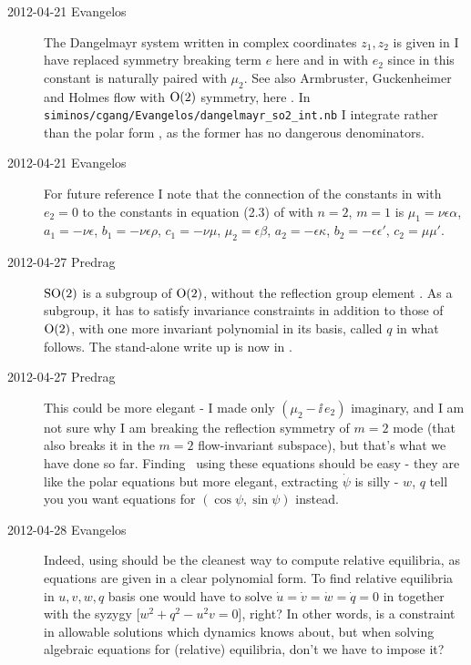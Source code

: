 \begin{description}
\item[2012-04-21 Evangelos]
The Dangelmayr system written in complex coordinates $z_1,z_2$
is given in  I have replaced symmetry breaking term $e$
here and in  with $e_2$ since in this constant is
naturally paired with $\mu_2$. See also Armbruster, Guckenheimer and
Holmes flow with $\textrm{O}(2)$ symmetry, here . In
\texttt{siminos/cgang/Evangelos/dangelmayr\_so2\_int.nb} I integrate
 rather than the polar form , as the
former has no dangerous denominators.

\item[2012-04-21 Evangelos] For future reference I note that the
connection of the constants in  with $e_2=0$ to the
constants in equation (2.3) of  with
$n=2$, $m=1$ is $\mu_1=\nu\epsilon\alpha$,
$a_1=-\nu\epsilon$, $b_1=-\nu\epsilon\rho$, $c_1=-\nu\mu$, $\mu_2=\epsilon\beta$,
$a_2=-\epsilon\kappa$, $b_2=-\epsilon\epsilon'$, $c_2=\mu\mu'$.

\item[2012-04-27 Predrag]
$\textrm{SO}(2)$ is a {subgroup} of $\textrm{O}(2)$, without the reflection group
element . As a subgroup, it has to satisfy invariance
constraints in addition to those of $\textrm{O}(2)$, with one more invariant
polynomial in its basis, called $q$ in what follows. The
stand-alone write up is now in .


\item[2012-04-27 Predrag] This could be more elegant - I made only
$(\mu_2-\ii\, e_2)$ imaginary, and I am not sure why I am breaking the
reflection symmetry of $m=2$ mode (that also breaks it in the $m=2$
flow-invariant subspace), but that's what we have done so far. Finding
\eqva\ using these equations should be easy - they are like the polar
equations but more elegant, extracting $\dot{\psi}$ is silly - $w$, $q$
tell you you want equations for $(\cos \psi, \sin \psi)$ instead.

\item[2012-04-28 Evangelos] Indeed, using  should be the
cleanest way to compute relative equilibria, as equations are given in
a clear polynomial form.
To find relative equilibria in $u,v,w,q$ basis
one would have to solve $\dot{u}=\dot{v}=\dot{w}=\dot{q}=0$ in 
together with the syzygy  [$w^2+q^2 - u^2v =0$], right?
In other words,  is a constraint in allowable solutions which
dynamics knows about, but when solving algebraic equations for (relative)
equilibria, don't we have to impose it?


\end{description}
